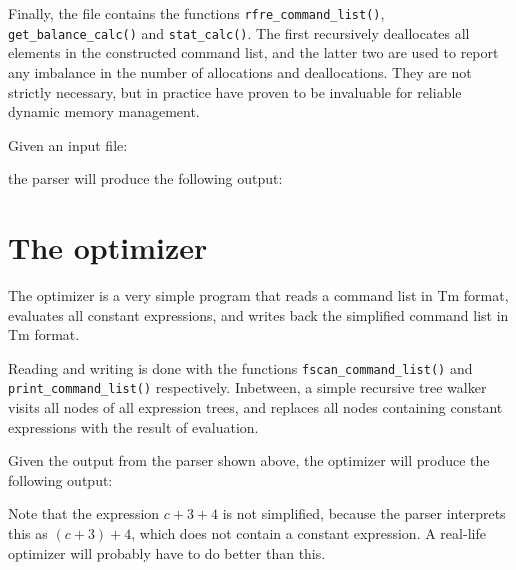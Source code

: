 \begin{sloppypar}
Finally, the file contains the functions \verb'rfre_command_list()',
\verb'get_balance_calc()' and \verb'stat_calc()'. The first recursively
deallocates all elements in the constructed command list, and the latter
two are used to report any imbalance in the number of allocations and
deallocations. They are not strictly necessary, but in practice have
proven to be invaluable for reliable dynamic memory management.
\end{sloppypar}
\par
Given an input file:
\begin{showfile}
\end{showfile}
the parser will produce the following output:
\begin{showfile}
\end{showfile}
\section{The optimizer}
The optimizer is a very simple program that reads a command list
in Tm format, evaluates all constant expressions, and writes back the
simplified command list in Tm format.
\begin{showfile}
\end{showfile}
\begin{sloppypar}
Reading and writing is done with the functions
\verb'fscan_command_list()' and \verb'print_command_list()'
respectively. Inbetween, a simple recursive tree walker visits all nodes
of all expression trees, and replaces all nodes containing constant
expressions with the result of evaluation.
\end{sloppypar}

Given the output from the parser shown above, the optimizer will produce
the following output:
\begin{showfile}
\end{showfile}
Note that the expression $c+3+4$ is not simplified, because the parser
interprets this as $(c+3)+4$, which does not contain a constant
expression. A real-life optimizer will probably have to do better
than this.
